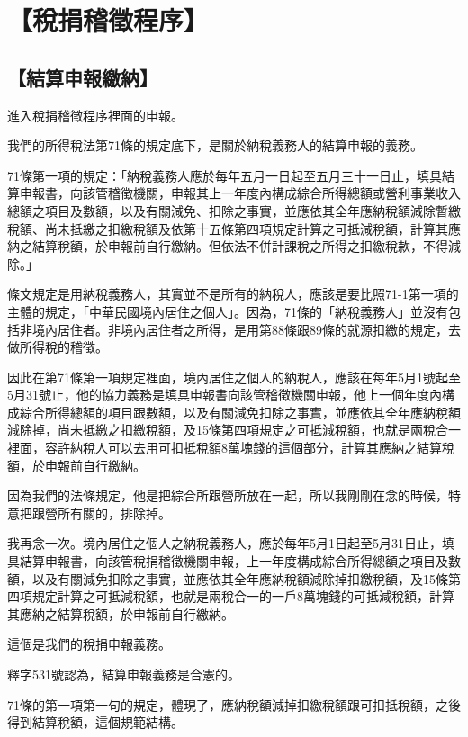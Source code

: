 \documentclass[oneside,sub3section]{ctexbook}
\begin{document}
\hypertarget{ux7a05ux6350ux7a3dux5fb5ux7a0bux5e8f}{%
\section{【稅捐稽徵程序】}\label{ux7a05ux6350ux7a3dux5fb5ux7a0bux5e8f}}

\hypertarget{ux7d50ux7b97ux7533ux5831ux7e73ux7d0d}{%
\subsection{【結算申報繳納】}\label{ux7d50ux7b97ux7533ux5831ux7e73ux7d0d}}

進入稅捐稽徵程序裡面的申報。

我們的所得稅法第71條的規定底下，是關於納稅義務人的結算申報的義務。

71條第一項的規定：「納稅義務人應於每年五月一日起至五月三十一日止，填具結算申報書，向該管稽徵機關，申報其上一年度內構成綜合所得總額或營利事業收入總額之項目及數額，以及有關減免、扣除之事實，並應依其全年應納稅額減除暫繳稅額、尚未抵繳之扣繳稅額及依第十五條第四項規定計算之可抵減稅額，計算其應納之結算稅額，於申報前自行繳納。但依法不併計課稅之所得之扣繳稅款，不得減除。」

條文規定是用納稅義務人，其實並不是所有的納稅人，應該是要比照71-1第一項的主體的規定，「中華民國境內居住之個人」。因為，71條的「納稅義務人」並沒有包括非境內居住者。非境內居住者之所得，是用第88條跟89條的就源扣繳的規定，去做所得稅的稽徵。

因此在第71條第一項規定裡面，境內居住之個人的納稅人，應該在每年5月1號起至5月31號止，他的協力義務是填具申報書向該管稽徵機關申報，他上一個年度內構成綜合所得總額的項目跟數額，以及有關減免扣除之事實，並應依其全年應納稅額減除掉，尚未抵繳之扣繳稅額，及15條第四項規定之可抵減稅額，也就是兩稅合一裡面，容許納稅人可以去用可扣抵稅額8萬塊錢的這個部分，計算其應納之結算稅額，於申報前自行繳納。

因為我們的法條規定，他是把綜合所跟營所放在一起，所以我剛剛在念的時候，特意把跟營所有關的，排除掉。

我再念一次。境內居住之個人之納稅義務人，應於每年5月1日起至5月31日止，填具結算申報書，向該管稅捐稽徵機關申報，上一年度構成綜合所得總額之項目及數額，以及有關減免扣除之事實，並應依其全年應納稅額減除掉扣繳稅額，及15條第四項規定計算之可抵減稅額，也就是兩稅合一的一戶8萬塊錢的可抵減稅額，計算其應納之結算稅額，於申報前自行繳納。

這個是我們的稅捐申報義務。

釋字531號認為，結算申報義務是合憲的。

71條的第一項第一句的規定，體現了，應納稅額減掉扣繳稅額跟可扣抵稅額，之後得到結算稅額，這個規範結構。
\end{document}
